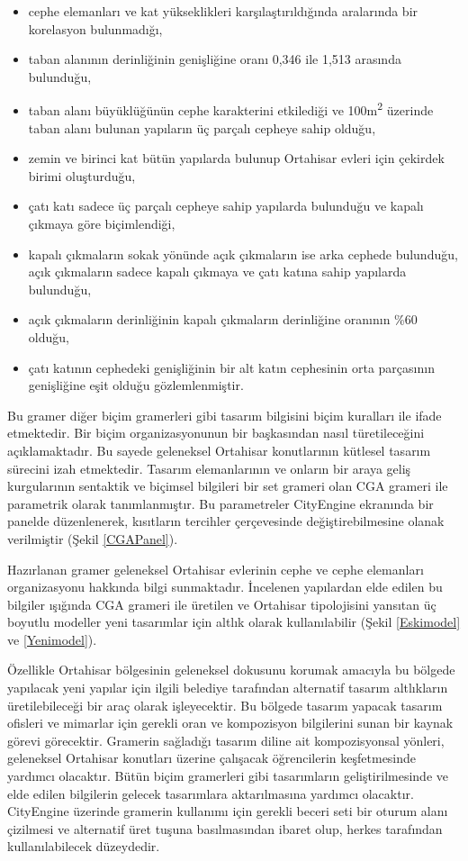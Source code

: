 \documentclass[12pt,turkish,a4paperpaper,]{report}
\providecommand{\tightlist}{%
  \setlength{\itemsep}{0pt}\setlength{\parskip}{0pt}}
\begin{document}
\begin{itemize}
\tightlist
\item
  cephe elemanları ve kat yükseklikleri karşılaştırıldığında aralarında
  bir korelasyon bulunmadığı,
\item
  taban alanının derinliğinin genişliğine oranı 0,346 ile 1,513 arasında
  bulunduğu,
\item
  taban alanı büyüklüğünün cephe karakterini etkilediği ve
  100m\textsuperscript{2} üzerinde taban alanı bulunan yapıların üç
  parçalı cepheye sahip olduğu,
\item
  zemin ve birinci kat bütün yapılarda bulunup Ortahisar evleri için
  çekirdek birimi oluşturduğu,
\item
  çatı katı sadece üç parçalı cepheye sahip yapılarda bulunduğu ve
  kapalı çıkmaya göre biçimlendiği,
\item
  kapalı çıkmaların sokak yönünde açık çıkmaların ise arka cephede
  bulunduğu, açık çıkmaların sadece kapalı çıkmaya ve çatı katına sahip
  yapılarda bulunduğu,
\item
  açık çıkmaların derinliğinin kapalı çıkmaların derinliğine oranının
  \%60 olduğu,
\item
  çatı katının cephedeki genişliğinin bir alt katın cephesinin orta
  parçasının genişliğine eşit olduğu gözlemlenmiştir.
\end{itemize}

Bu gramer diğer biçim gramerleri gibi tasarım bilgisini biçim kuralları
ile ifade etmektedir. Bir biçim organizasyonunun bir başkasından nasıl
türetileceğini açıklamaktadır. Bu sayede geleneksel Ortahisar
konutlarının kütlesel tasarım sürecini izah etmektedir. Tasarım
elemanlarının ve onların bir araya geliş kurgularının sentaktik ve
biçimsel bilgileri bir set grameri olan CGA grameri ile parametrik
olarak tanımlanmıştır. Bu parametreler CityEngine ekranında bir panelde
düzenlenerek, kısıtların tercihler çerçevesinde değiştirebilmesine
olanak verilmiştir (Şekil \ref{CGAPanel}).

Hazırlanan gramer geleneksel Ortahisar evlerinin cephe ve cephe
elemanları organizasyonu hakkında bilgi sunmaktadır. İncelenen
yapılardan elde edilen bu bilgiler ışığında CGA grameri ile üretilen ve
Ortahisar tipolojisini yansıtan üç boyutlu modeller yeni tasarımlar için
altlık olarak kullanılabilir (Şekil \ref{Eskimodel} ve \ref{Yenimodel}).

Özellikle Ortahisar bölgesinin geleneksel dokusunu korumak amacıyla bu
bölgede yapılacak yeni yapılar için ilgili belediye tarafından
alternatif tasarım altlıkların üretilebileceği bir araç olarak
işleyecektir. Bu bölgede tasarım yapacak tasarım ofisleri ve mimarlar
için gerekli oran ve kompozisyon bilgilerini sunan bir kaynak görevi
görecektir. Gramerin sağladığı tasarım diline ait kompozisyonsal
yönleri, geleneksel Ortahisar konutları üzerine çalışacak öğrencilerin
keşfetmesinde yardımcı olacaktır. Bütün biçim gramerleri gibi
tasarımların geliştirilmesinde ve elde edilen bilgilerin gelecek
tasarımlara aktarılmasına yardımcı olacaktır. CityEngine üzerinde
gramerin kullanımı için gerekli beceri seti bir oturum alanı çizilmesi
ve alternatif üret tuşuna basılmasından ibaret olup, herkes tarafından
kullanılabilecek düzeydedir.
\end{document}
